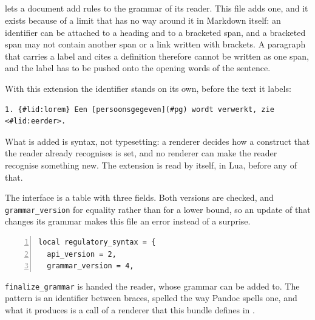 \subsection{}

 lets a document add rules to the grammar of its reader. This file adds one, and it
exists because of a limit that has no way around it in Markdown itself: an identifier can be attached
to a heading and to a bracketed span, and a bracketed span may not contain another span or a link
written with brackets. A paragraph that carries a label and cites a definition therefore cannot be
written as one span, and the label has to be pushed onto the opening words of the sentence.

With this extension the identifier stands on its own, before the text it labels:

\begin{lstlisting}[style=md]
1. {#lid:lorem} Een [persoonsgegeven](#pg) wordt verwerkt, zie <#lid:eerder>.
\end{lstlisting}

What is added is syntax, not typesetting: a renderer decides how a construct that the reader already
recognises is set, and no renderer can make the reader recognise something new. The extension is read
by  itself, in Lua, before any of that.

The interface is a table with three fields. Both versions are checked, and \texttt{grammar\_version}
for equality rather than for a lower bound, so an update of  that changes its
grammar makes this file an error instead of a surprise.
\begin{lstlisting}[language={[5.3]Lua},numbers=left]
local regulatory_syntax = {
  api_version = 2,
  grammar_version = 4,

\end{lstlisting}
\texttt{finalize\_grammar} is handed the reader, whose grammar can be added to. The pattern is an
identifier between braces, spelled the way Pandoc spells one, and what it produces is a call of a
renderer that this bundle defines in .

